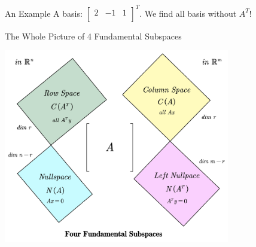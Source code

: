 \documentclass{beamer}
\begin{document}
\begin{frame}{An Example}
A basis: $\left[ \begin{matrix}
	2&		-1&		1\\
\end{matrix} \right] ^T$. We find all basis without $A^T$!
\end{frame}

\begin{frame}{The Whole Picture of 4 Fundamental Subspaces}
\begin{center}
    \includegraphics[width=0.74\textwidth]{subspace.jpg}
\end{center}
\end{frame}
\end{document}
